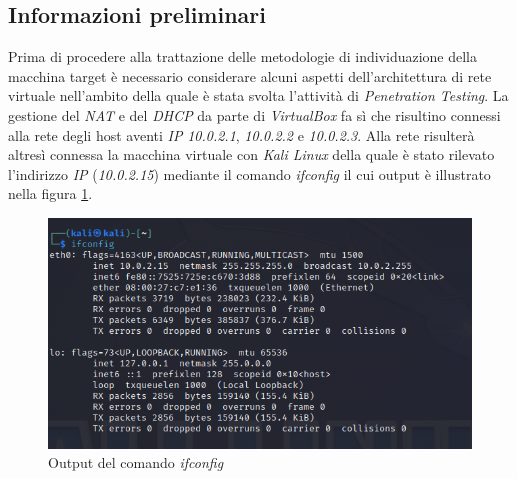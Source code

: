 \subsection{Informazioni preliminari}
Prima di procedere alla trattazione delle metodologie di individuazione della macchina target è necessario considerare alcuni aspetti dell'architettura di rete virtuale nell'ambito della quale è stata svolta l'attività di \emph{Penetration Testing}. La gestione del \emph{NAT} e del \emph{DHCP} da parte di \emph{VirtualBox} fa sì che risultino connessi alla rete degli host aventi \emph{IP} \emph{10.0.2.1}, \emph{10.0.2.2} e \emph{10.0.2.3}. Alla rete risulterà altresì connessa la macchina virtuale con \emph{Kali Linux} della quale è stato rilevato l'indirizzo \emph{IP} (\emph{10.0.2.15}) mediante il comando \emph{ifconfig} il cui output è illustrato nella figura \ref{fig:ifconfig}. 
\begin{figure}[h]
    \centering
    \includegraphics[scale=0.8]{capitoli/images/ifconfig.png}
    \caption{Output del comando \emph{ifconfig}}
    \label{fig:ifconfig}
\end{figure}

